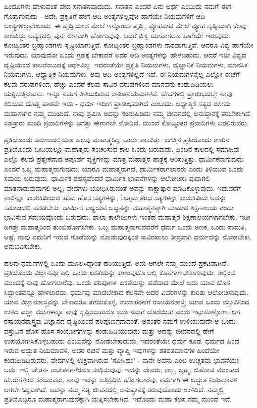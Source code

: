 ಹಿಂದೂಗಳು ಹೇಳುವಂತೆ ವೇದ ಸನಾತನವಾದುದು. ಸನಾತನ ಎಂದರೆ ಏನು ಅರ್ಥ ಎಂಬುದು ನಮಗೆ ಈಗ ಗೊತ್ತಾಗುವುದು - ಅದೇ, ಪ್ರಕೃತಿಗೆ ಹೇಗೆ ಆದಿ ಅಂತ್ಯಗಳಿಲ್ಲವೋ ಹಾಗೆಯೇ ನಿಯಮಗಳಿಗೆ ಆದಿ ಅಂತ್ಯಗಳಿಲ್ಲವೆಂಬುದು. ಈ ಪೃಥ್ವಿಯಾದ ಮೇಲೆ ಇನ್ನೊಂದು ಪೃಥ್ವಿ, ವ್ಯೂಹವಾದ ಮೇಲೆ ವ್ಯೂಹ ಸೃಷ್ಟಿಯಾಗಿ ಕೆಲವು ಕಾಲವಿದ್ದು ಅವ್ಯಕ್ತದಲ್ಲಿ ಪುನಃ ಲೀನವಾಗಿ ಹೋಗುವುವು. ಆದರೆ ವಿಶ್ವ ಯಾವಾಗಲೂ ಹಾಗೆಯೇ ಇರುವುದು. ಕೋಟ್ಯಂತರ ಬ್ರಹ್ಮಾಂಡಗಳು ಸೃಷ್ಟಿಯಾಗುತ್ತಿವೆ. ಕೋಟ್ಯಂತರ ಬ್ರಹ್ಮಾಂಡಗಳು ನಾಶವಾಗುತ್ತಿವೆ. ಆದರೂ ವಿಶ್ವ ಹಾಗೆಯೇ ಇರುವುದು. ಯಾವುದೋ ಒಂದು ಗ್ರಹಕ್ಕೆ ಬೇಕಾದರೆ ಅದರ ಆದಿ ಅಂತ್ಯಗಳನ್ನು ಹೇಳಬಹುದು. ಆದರೆ ಇಡೀ ವಿಶ್ವದ ದೃಷ್ಟಿಯಿಂದ ಕಾಲವೆಂಬುದಕ್ಕೆ ಅರ್ಥವಿಲ್ಲ. ಇದರಂತೆಯೇ ಪ್ರಕೃತಿ ನಿಯಮಗಳು, ವೈಜ್ಞಾನಿಕ ನಿಯಮಗಳು, ಮಾನಸಿಕ ನಿಯಮಗಳು, ಆಧ್ಯಾತ್ಮಿಕ ನಿಯಮಗಳು, ಅವು ಆದಿ ಅಂತ್ಯಗಳಿಲ್ಲದೆ ಇವೆ. ಈ ನಿಯಮಗಳನ್ನೆಲ್ಲ ಎಲ್ಲೋ ಈಚೆಗೆ ಕೆಲವು ವರುಷಗಳಿಂದ, ಹೆಚ್ಚು ಎಂದರೆ ಕೆಲವು ಸಾವಿರ ವರುಷಗಳಿಂದ ಮಾನವನು ಕಂಡುಹಿಡಿಯಲು ಯತ್ನಿಸುತ್ತಿರುವನು. ಇನ್ನೂ ನಮಗೆ ತಿಳಿಯದಿರುವ ಅನಂತನಿಯಮಗಳಿವೆ. ವೇದಗಳಲ್ಲಿ ಪ್ರಾರಂಭದಲ್ಲೇ ನಾವು ಕಲಿಯವ ದೊಡ್ಡ ಪಾಠವೇ ಇದು - ಧರ್ಮ ಇದೀಗ ಪ್ರಾರಂಭವಾಗಿದೆ ಎಂಬುದು. ಆಧ್ಯಾತ್ಮಿಕ ಸತ್ಯದ ಅಸೀಮ ಮಹಾಸಾಗರ ನಮ್ಮ ಮುಂದಿದೆ. ನಾವು ಶ್ರಮಿಸಿ ಅದನ್ನು ಕಂಡುಹಿಡಿದು ನಮ್ಮ ಜೀವನದಲ್ಲಿ ಅನುಷ್ಠಾನಕ್ಕೆ ತರಬೇಕಾಗಿದೆ. ಸಹಸ್ರಾರು ಮಂದಿ ಪ್ರವಾದಿಗಳನ್ನು ಜಗತ್ತು ಈಗಾಗಲೇ ನೋಡಿದೆ. ಮುಂದೆ ಕೋಟ್ಯಂತರ ಪ್ರವಾದಿಗಳು ಬರಲಿರುವರು.

ಪ್ರತಿಯೊಂದು ಸಮಾಜದಲ್ಲಿಯೂ ಹಲವು ಮಹಾತ್ಮರಿದ್ದ ಒಂದು ಕಾಲವಿತ್ತು. ಜಗತ್ತಿನ ಪ್ರತಿಯೊಂದು ಊರಿನ ಪ್ರತಿಯೊಂದು ಬೀದಿಯಲ್ಲೂ ಮಹಾತ್ಮರು ಸಂಚರಿಸುವ ಕಾಲ ಒಂದು ಬರುವುದು. ಹಿಂದಿನ ಕಾಲದಲ್ಲಿ ಸಮಾಜವು ಎಲ್ಲೊ ಕೆಲವು ಪ್ರತ್ಯೇಕವಾದ ಅಪೂರ್ವ ವ್ಯಕ್ತಿಗಳನ್ನು ಮಾತ್ರ ಮಹಾತ್ಮರ ಪಾತ್ರಕ್ಕೆ ಆರಿಸುತ್ತಿತ್ತು. ಧಾರ್ಮಿಕನಾಗುವುದು ಎಂದರೆ ಒಬ್ಬ ಮಹಾತ್ಮನಾಗುವುದು; ಯಾರೂ ಮಹಾತ್ಮರಾಗದೆ, ಧಾರ್ಮಿಕರಾಗಲಾರರು ಎಂದು ತಿಳಿಯುವ ಒಂದು ಸಮಯ ಬರುವುದು. ಧಾರ್ಮಿಕ ರಹಸ್ಯವೆಂದರೆ ಧಾರ್ಮಿಕ ಭಾವನೆಗಳನ್ನು ಆಲೋಚಿಸು ವುದಾಗಲಿ ಮಾತನಾಡುವುದಾಗಲಿ ಅಲ್ಲ; ವೇದಗಳು ಬೋಧಿಸಿರುವಂತೆ ಅವನ್ನು ಸಾಕ್ಷಾತ್ಕಾರ ಮಾಡಿಕೊಳ್ಳುವುದು. ಇದುವರೆಗೆ ನಾವಿನ್ನೂ ಕಂಡುಹಿಡಿಯದ ಹೊಸ ಹೊಸ ಸತ್ಯಗಳನ್ನು, ಉತ್ತಮ ತರದ ಸತ್ಯಗಳನ್ನು ಕಂಡುಹಿಡಿದು ಅವನ್ನು ಸಮಾಜದಲ್ಲಿ ಹರಡಬೇಕು. ಧಾರ್ಮಿಕ ಅಧ್ಯಯನ ಒಬ್ಬನನ್ನು ಮಹಾತ್ಮನನ್ನಾಗಿ ಮಾಡುವ ಶಿಕ್ಷಣಾಲಯ ಎಂದು ಭಾವಿಸುವ ಸಮಯವೊಂದು ಬರುವುದು. ಶಾಲಾ ಕಾಲೇಜುಗಳು ಇಂತಹ ಮಹಾತ್ಮರ ಶಿಕ್ಷಣಾಲಯಗಳಾಗಬೇಕು. ಇಡೀ ಜಗತ್ತೇ ಮಹಾತ್ಮರಿಂದ ತುಂಬಿಹೋಗಬೇಕು. ಒಬ್ಬ ಮಹಾತ್ಮನಾಗುವವರೆಗೆ ಧರ್ಮ ಒಂದು ಅಣಕ, ಒಂದು ಸಾಮತಿ, ಅಷ್ಟೆ. ನಾವು ಎದುರಿಗೆ ಇರುವ ಗೊಡೆಯನ್ನು ನೋಡುವುದಕ್ಕಿಂತ ಸಾವಿರಪಾಲು ತೀವ್ರವಾಗಿ ಧರ್ಮವನ್ನು ನೋಡಬೇಕು, ಅನುಭವಿಸಬೇಕು.

ಹಲವು ಧರ್ಮಗಳಲ್ಲಿ ಒಂದು ಮೂಲಸಿದ್ದಾಂತ ಹರಿಯುತ್ತಿದೆ. ಅದು ಆಗಲೇ ನಮ್ಮ ಮುಂದೆ ಪ್ರಕಟವಾಗಿದೆ. ಪ್ರತಿಯೊಂದು ವಿಜ್ಞಾನವೂ ಎಲ್ಲಿ ಒಂದು ಏಕತೆಯನ್ನು ಕಾಣುವುದೊ ಅಲ್ಲಿ ಕೊನೆಗಾಣಬೇಕಾಗುವುದು. ಅಲ್ಲಿಂದ ಮುಂದಕ್ಕೆ ನಾವು ಹೋಗಲಾರೆವು. ಒಂದು ಪರಿಪೂರ್ಣ ಏಕತೆಯನ್ನು ಪಡೆದಾದ ಮೇಲೆ ಅದು ಯಾವ ಹೊಸ ಸಿದ್ದಾಂತವನ್ನೂ ಹೇಳಲಾರದು. ಧರ್ಮವು ಮಾಡಬೇಕಾದ ಕೆಲಸವೇ ಅದರ ವಿವರಗಳನ್ನು ಕುರಿತು ಆಲೋಚಿಸುವುದು. ಯಾವ ವಿಜ್ಞಾನಶಾಸ್ತ್ರವನ್ನು ಬೇಕಾದರೂ ತೆಗೆದುಕೊಳ್ಳಿ. ಉದಾಹರಣೆಗೆ ರಸಾಯನಶಾಸ್ತ್ರ; ಯಾವ ಒಂದು ವಸ್ತುವಿನಿಂದ ಉಳಿದ ಎಲ್ಲಾ ವಸ್ತುಗಳನ್ನೂ ನಾವು ಸೃಷ್ಟಿಸಬಹುದೊ ಅದು ನಮಗೆ ದೊರೆಯಿತು ಎಂದು ಇಟ್ಟುಕೊಳ್ಳೋಣ. ಆಗ ರಸಾಯನಶಾಸ್ತ್ರವು ವಿಜ್ಞಾನದ ದೃಷ್ಟಿಯಿಂದ ಪರಿಪೂರ್ಣವಾದಂತೆ. ಅನಂತರ ನಮಗೆ ಉಳಿಯುವುದೇ ಆ ಒಂದು ವಸ್ತುವಿನ ಹೊಸ ಹೊಸ ಸಂಯೋಗಗಳನ್ನು ಕಂಡುಹಿಡಿಯುವುದು ಮತ್ತು ಅದನ್ನು ಜೀವನದಲ್ಲಿ ಹೇಗೆ ಉಪಯೋಗಿಸಿಕೊಳ್ಳಬಹುದು ಎಂಬುದನ್ನು ನೋಡಬೇಕಾದುದು. ಇದರಂತೆಯೇ ಧರ್ಮ ಕೂಡ. ಧರ್ಮದ ಹಿಂದೆ ಇರುವ ಅದ್ಭುತ ನಿಯಮಾವಳಿ, ಅದರ ರಚನೆ ಮತ್ತು ವ್ಯಾಪ್ತಿ ಇವುಗಳನ್ನು ಶತಶತಮಾನಗಳ ಹಿಂದೆಯೇ ಕಂಡುಹಿಡಿದಿರುವರು. ವೇದಗಳಲ್ಲಿ ಉಕ್ತವಾಗಿರುವ 'ಸೋsಹಂ' - ನಾನೇ ಅವನು ಎಂಬ ಉಚ್ಚತಮ ಭಾವನೆಯೇ ಅದು. ಇಲ್ಲಿ ಚೇತನ- ಅಚೇತನಗಳೆರಡೂ ಸಂಧಿಸುವುವು. ಇದನ್ನು ದೇವರು, ಅಲ್ಲ, ಬ್ರಹ್ಮ, ಜಿಹೋವ ಮುಂತಾದ ಹೆಸರುಗಳಿಂದ ಕರೆಯುವರು. ನಾವು ಇದನ್ನು ಅತಿಕ್ರಮಿಸಿ ಹೋಗಲಾರೆವು. ನಮಗಾಗಿ ಈ ಅದ್ಭುತ ನಿಯಮಾವಳಿ ಆಗಲೇ ಸಿದ್ದವಾಗಿದೆ. ಅದನ್ನು ನಮ್ಮ ನಿತ್ಯ ಜೀವನದಲ್ಲಿ ಅನುಷ್ಠಾನಕ್ಕೆ ತರುವುದೊಂದು ಉಳಿದಿದೆ. ನಮ್ಮಲ್ಲಿ ಪ್ರತಿಯೊಬ್ಬರೂ ಮಹಾತ್ಮರಾಗುವುದಕ್ಕಾಗಿ ಯತ್ನಿಸಬೇಕಾಗಿದೆ. ಇದೊಂದು ಮಹಾ ಕೆಲಸ ನಮ್ಮ ಮುಂದೆ ಇದೆ.

